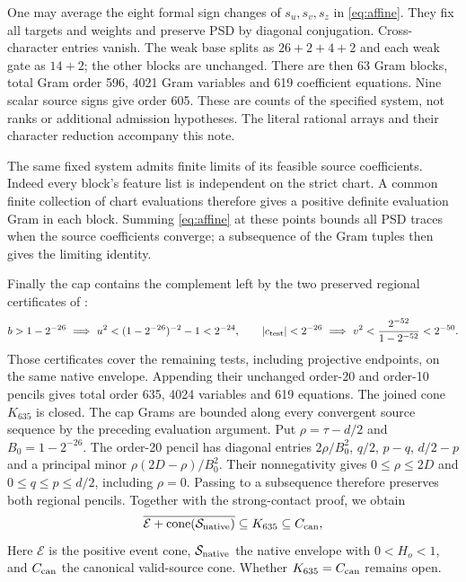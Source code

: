 \documentclass[10pt]{article}
\begin{document}
One may average the eight formal sign changes of $s_u,s_v,s_z$ in
\eqref{eq:affine}. They fix all targets and weights and preserve PSD by
diagonal conjugation. Cross-character entries vanish. The weak base splits
as $26+2+4+2$ and each weak gate as $14+2$; the other blocks are unchanged.
There are then 63 Gram blocks, total Gram order 596, 4021 Gram variables
and 619 coefficient equations. Nine scalar source signs give order 605.
These are counts of the specified system, not ranks or additional admission
hypotheses. The literal rational arrays and their character reduction
accompany this note.

The same fixed system admits finite limits of its feasible source coefficients.
Indeed every block's feature list is independent on the strict chart.
A common finite collection of chart evaluations therefore gives a positive
definite evaluation Gram in each block. Summing \eqref{eq:affine} at these
points bounds all PSD traces when the source coefficients converge; a
subsequence of the Gram tuples then gives the limiting identity.

Finally the cap contains the complement left by the two preserved regional
certificates of \cite{regional}:
\[
 b>1-2^{-26}\ \Longrightarrow\
 u^2<(1-2^{-26})^{-2}-1<2^{-24},\qquad
 |c_{\rm test}|<2^{-26}\ \Longrightarrow\
 v^2<\frac{2^{-52}}{1-2^{-52}}<2^{-50}.
\]
Those certificates cover the remaining tests, including projective endpoints,
on the same native envelope. Appending their unchanged order-20 and order-10
pencils gives total order 635, 4024 variables and 619 equations.
The joined cone $K_{635}$ is closed. The cap Grams are bounded along every
convergent source sequence by the preceding evaluation argument. Put
$\rho=\tau-d/2$ and $B_0=1-2^{-26}$. The order-20 pencil has diagonal
entries $2\rho/B_0^2$, $q/2$, $p-q$, $d/2-p$ and a principal minor
$\rho(2D-\rho)/B_0^2$. Their nonnegativity gives
$0\leq\rho\leq2D$ and $0\leq q\leq p\leq d/2$, including $\rho=0$.
Passing to a subsequence therefore preserves both regional pencils.
Together with the strong-contact proof, we obtain
\[
 \overline{\mathcal E+\operatorname{cone}(\mathcal S_{\rm native})}
 \subseteq K_{635}\subseteq C_{\rm can},
\]
Here $\mathcal E$ is the positive event cone, $\mathcal S_{\rm native}$
the native envelope with $0<H_o<1$, and $C_{\rm can}$ the canonical
valid-source cone. Whether $K_{635}=C_{\rm can}$ remains open.

\appendix
\end{document}

